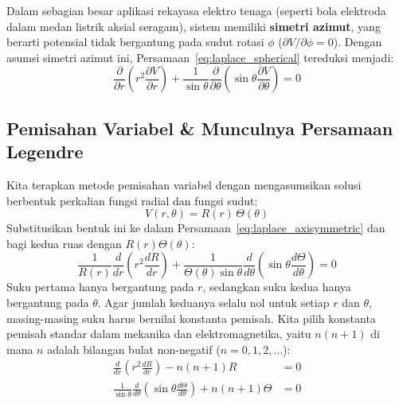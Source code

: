 \documentclass[11pt,a4paper]{article}
\theoremstyle{definition}
\begin{document}
Dalam sebagian besar aplikasi rekayasa elektro tenaga (seperti bola elektroda dalam medan listrik aksial seragam), sistem memiliki \textbf{simetri azimut}, yang berarti potensial tidak bergantung pada sudut rotasi $\phi$ ($\partial V/\partial \phi = 0$). Dengan asumsi simetri azimut ini, Persamaan~\eqref{eq:laplace_spherical} tereduksi menjadi:
\begin{equation}
    \frac{\partial}{\partial r}\left( r^2 \frac{\partial V}{\partial r} \right) + \frac{1}{\sin\theta} \frac{\partial}{\partial \theta}\left( \sin\theta \frac{\partial V}{\partial \theta} \right) = 0
    \label{eq:laplace_axisymmetric}
\end{equation}

\subsection{Pemisahan Variabel \& Munculnya Persamaan Legendre}
Kita terapkan metode pemisahan variabel dengan mengasumsikan solusi berbentuk perkalian fungsi radial dan fungsi sudut:
\begin{equation}
    V(r, \theta) = R(r) \, \Theta(\theta)
\end{equation}
Substitusikan bentuk ini ke dalam Persamaan~\eqref{eq:laplace_axisymmetric} dan bagi kedua ruas dengan $R(r) \Theta(\theta)$:
\begin{equation}
    \frac{1}{R(r)} \frac{d}{dr}\left( r^2 \frac{dR}{dr} \right) + \frac{1}{\Theta(\theta) \sin\theta} \frac{d}{d\theta}\left( \sin\theta \frac{d\Theta}{d\theta} \right) = 0
    \label{eq:separation_spherical}
\end{equation}
Suku pertama hanya bergantung pada $r$, sedangkan suku kedua hanya bergantung pada $\theta$. Agar jumlah keduanya selalu nol untuk setiap $r$ dan $\theta$, masing-masing suku harus bernilai konstanta pemisah. Kita pilih konstanta pemisah standar dalam mekanika dan elektromagnetika, yaitu $n(n+1)$ di mana $n$ adalah bilangan bulat non-negatif ($n = 0, 1, 2, \dots$):
\begin{align}
    \frac{d}{dr}\left( r^2 \frac{dR}{dr} \right) - n(n+1) R &= 0 \label{eq:radial_ode} \\
    \frac{1}{\sin\theta} \frac{d}{d\theta}\left( \sin\theta \frac{d\Theta}{d\theta} \right) + n(n+1) \Theta &= 0 \label{eq:angular_ode}
\end{align}
\end{document}
